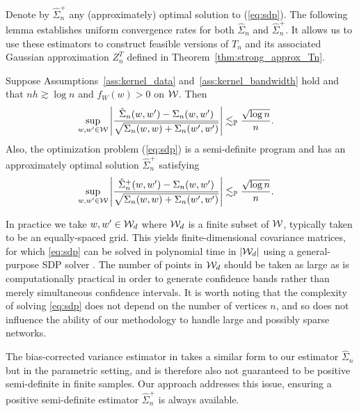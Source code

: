 Denote by $\hat\Sigma_n^+$ any (approximately) optimal solution to
(\ref{eq:sdp}). The following lemma establishes uniform convergence rates
for both $\hat \Sigma_n$ and $\hat \Sigma_n^+$. It allows us to use
these estimators to construct feasible versions of $T_n$ and its associated
Gaussian approximation $Z_n^{T}$ defined in Theorem~\ref{thm:strong_approx_Tn}.
%
\begin{lemma}
  \label{lem:sdp}
  Suppose Assumptions~\ref{ass:kernel_data} and~\ref{ass:kernel_bandwidth} hold
  and that $n h \gtrsim \log n$ and $f_W(w) > 0$ on $\mathcal{W}$. Then
  \begin{align*}
    \sup_{w,w' \in \mathcal{W}}
    \left| \frac{\hat \Sigma_n(w,w') - \Sigma_n(w,w')}
    {\sqrt{\Sigma_n(w,w) + \Sigma_n(w',w')}} \right|
    &\lesssim_{\mathbb{P}} \frac{\sqrt{\log n}}{n}.
  \end{align*}
  Also, the optimization problem (\ref{eq:sdp}) is a semi-definite program
  \citep[SDP,][]{laurent2005semidefinite} and has an approximately optimal
  solution $\hat\Sigma_n^+$ satisfying
  \begin{align*}
    \sup_{w,w' \in \mathcal{W}} \left|
    \frac{\hat \Sigma_n^+(w,w') - \Sigma_n(w,w')}
    {\sqrt{\Sigma_n(w,w) + \Sigma_n(w',w')}} \right|
    &\lesssim_{\mathbb{P}} \frac{\sqrt{\log n}}{n}.
  \end{align*}
\end{lemma}

In practice we take $w, w' \in \mathcal{W}_d$ where $\mathcal{W}_d$ is a finite subset of
$\mathcal{W}$, typically taken to be an equally-spaced grid. This yields
finite-dimensional covariance matrices, for which \eqref{eq:sdp} can be solved
in polynomial time in $|\mathcal{W}_d|$ using a general-purpose SDP solver
\citep[e.g.\ by interior point methods,][]{laurent2005semidefinite}.
The number of points in $\mathcal{W}_d$ should be taken as large as is computationally
practical in order to generate confidence bands rather than merely simultaneous
confidence intervals. It is worth noting that the complexity of solving
\eqref{eq:sdp} does not depend on the number of vertices $n$, and so does not
influence the ability of our methodology to handle large and possibly sparse
networks.

The bias-corrected variance estimator in
\citet[Section~3.2]{matsushita2021jackknife} takes a similar form to our
estimator
$\hat\Sigma_n$ but in the parametric setting, and is therefore also not
guaranteed to be positive semi-definite in finite samples. Our approach
addresses this issue, ensuring a positive semi-definite estimator
$\hat\Sigma_n^+$ is always available.


